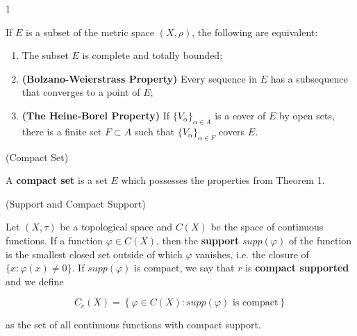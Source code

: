 \begin{theorem}{1 \cite{folland2013real}}

If $E$ is a subset of the metric space $(X,\rho)$, the following are equivalent:

\begin{enumerate}[label=(\roman*)]
    \item The subset $E$ is complete and totally bounded;
    
    \item \textbf{(Bolzano-Weierstrass Property)} Every sequence in $E$ has a subsequence that converges to a point of $E$;
    
    \item \textbf{(The Heine-Borel Property)} If $\{V_{\alpha}\}_{\alpha \in A}$ is a cover of $E$ by open sets, there is a finite set $F \subset A$ such that $\{V_{\alpha}\}_{\alpha \in F}$ covers $E$.
    
\end{enumerate}
\end{theorem}
\vspace{0.1in}

\begin{definition}{(Compact Set) \cite{folland2013real}}

A \textbf{compact set} is a set $E$ which possesses the properties from Theorem 1.

\end{definition}
\vspace{0.1in}

\begin{definition}{(Support and Compact Support) \cite{folland2013real}}

Let $(X,\tau)$ be a topological space and $C(X)$ be the space of continuous functions. If a function $\varphi \in C(X)$, then the \textbf{support} $supp(\varphi)$ of the function is the smallest closed set outside of which $\varphi$ vanishes, i.e. the closure of $\{x : \varphi(x) \neq 0\}$. If $supp(\varphi)$ is compact, we say that $r$ is \textbf{compact supported} and we define

\[ C_{c}(X) = 
    \left\{
        \varphi \in C(X): supp(\varphi) \text{ is compact}
    \right\}
\]

\vspace{0.05in}

\noindent as the set of all continuous functions with compact support.

\end{definition}
\vspace{0.1in}

